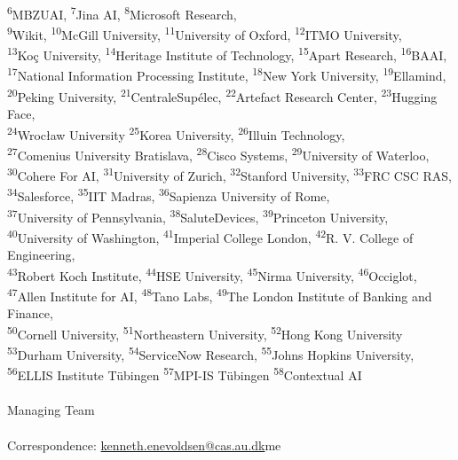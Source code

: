 {\textsuperscript{6}MBZUAI,
\textsuperscript{7}Jina AI, 
\textsuperscript{8}Microsoft Research, 
\\
\textsuperscript{9}Wikit, 
\textsuperscript{10}McGill University, 
\textsuperscript{11}University of Oxford, 
\textsuperscript{12}ITMO University, 
\\
\textsuperscript{13}Koç University, 
\textsuperscript{14}Heritage Institute of Technology, 
\textsuperscript{15}Apart Research, 
\textsuperscript{16}BAAI, 
\\
\textsuperscript{17}National Information Processing Institute, 
\textsuperscript{18}New York University, 
\textsuperscript{19}Ellamind, 
\\
\textsuperscript{20}Peking University, 
\textsuperscript{21}CentraleSupélec, 
\textsuperscript{22}Artefact Research Center, 
\textsuperscript{23}Hugging Face, 
\\
\textsuperscript{24}Wrocław University
\textsuperscript{25}Korea University, 
\textsuperscript{26}Illuin Technology, 
\\
\textsuperscript{27}Comenius University Bratislava, 
\textsuperscript{28}Cisco Systems, 
\textsuperscript{29}University of Waterloo, 
\\
\textsuperscript{30}Cohere For AI, 
\textsuperscript{31}University of Zurich, 
\textsuperscript{32}Stanford University, 
\textsuperscript{33}FRC CSC RAS, 
\\
\textsuperscript{34}Salesforce, 
\textsuperscript{35}IIT Madras, 
\textsuperscript{36}Sapienza University of Rome, 
\\
\textsuperscript{37}University of Pennsylvania, 
\textsuperscript{38}SaluteDevices, 
\textsuperscript{39}Princeton University, 
\\
\textsuperscript{40}University of Washington, 
\textsuperscript{41}Imperial College London, 
\textsuperscript{42}R. V. College of Engineering, 
\\
\textsuperscript{43}Robert Koch Institute, 
\textsuperscript{44}HSE University, 
\textsuperscript{45}Nirma University,
\textsuperscript{46}Occiglot,
\\
\textsuperscript{47}Allen Institute for AI, 
\textsuperscript{48}Tano Labs,
\textsuperscript{49}The London Institute of Banking and Finance, 
\\
\textsuperscript{50}Cornell University, 
\textsuperscript{51}Northeastern University, 
\textsuperscript{52}Hong Kong University
\\
\textsuperscript{53}Durham University, 
\textsuperscript{54}ServiceNow Research, 
\textsuperscript{55}Johns Hopkins University, 
\\
\textsuperscript{56}ELLIS Institute Tübingen
\textsuperscript{57}MPI-IS Tübingen
\textsuperscript{58}Contextual AI
\\
\\
\textsuperscript{\textdaggerdbl} Managing Team
\\
\\
\textsuperscript{\textdagger}Correspondence: \href{mailto:kenneth.enevoldsen@cas.au.dk}{kenneth.enevoldsen@cas.au.dk}me
}